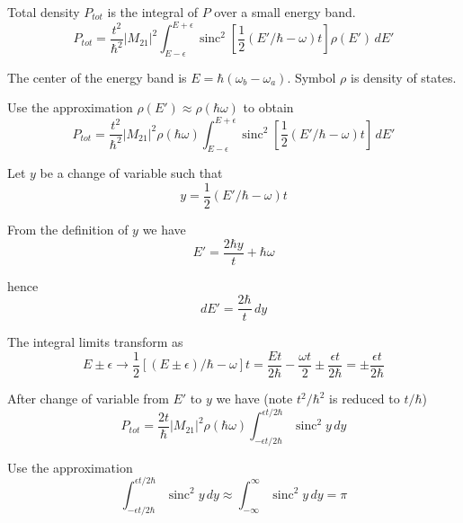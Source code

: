 Total density $P_{tot}$ is the integral of $P$ over a small energy band.
\begin{equation*}
P_{tot}=\frac{t^2}{\hbar^2}|M_{21}|^2
\int_{E-\epsilon}^{E+\epsilon}
\operatorname{sinc}^2\left[\frac{1}{2}(E'/\hbar-\omega)t\right]
\rho(E')\,dE'
\end{equation*}

The center of the energy band is $E=\hbar(\omega_b-\omega_a)$.
Symbol $\rho$ is density of states.

\bigskip

Use the approximation $\rho(E')\approx\rho(\hbar\omega)$ to obtain
\begin{equation*}
P_{tot}=\frac{t^2}{\hbar^2}|M_{21}|^2\rho(\hbar\omega)
\int_{E-\epsilon}^{E+\epsilon}
\operatorname{sinc}^2\left[\frac{1}{2}(E'/\hbar-\omega)t\right]\,dE'
\end{equation*}

Let $y$ be a change of variable such that
\begin{equation*}
y=\frac{1}{2}(E'/\hbar-\omega)t
\end{equation*}

From the definition of $y$ we have
\begin{equation*}
E'=\frac{2\hbar y}{t}+\hbar\omega
\end{equation*}

hence
\begin{equation*}
dE'=\frac{2\hbar}{t}\,dy
\end{equation*}

The integral limits transform as
\begin{equation*}
E\pm\epsilon
\rightarrow
\frac{1}{2}[(E\pm\epsilon)/\hbar-\omega]t
=\frac{Et}{2\hbar}-\frac{\omega t}{2}\pm\frac{\epsilon t}{2\hbar}
=\pm\frac{\epsilon t}{2\hbar}
\end{equation*}

After change of variable from $E'$ to $y$ we have
(note $t^2/\hbar^2$ is reduced to $t/\hbar$)
\begin{equation*}
P_{tot}=\frac{2t}{\hbar}|M_{21}|^2\rho(\hbar\omega)
\int_{-\epsilon t/2\hbar}^{\epsilon t/2\hbar}
\operatorname{sinc}^2y\,dy
\end{equation*}

Use the approximation
\begin{equation*}
\int_{-\epsilon t/2\hbar}^{\epsilon t/2\hbar}\operatorname{sinc}^2 y\,dy
\approx
\int_{-\infty}^\infty\operatorname{sinc}^2 y\,dy=\pi
\end{equation*}

